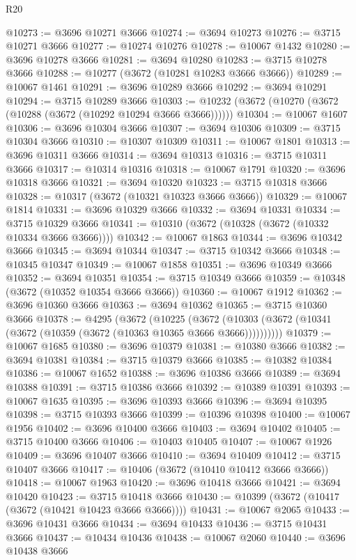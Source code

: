 \begin{lexlean}{R20}
\begin{coremodule}
@10273 := @3696 @10271 @3666
@10274 := @3694 @10273
@10276 := @3715 @10271 @3666
@10277 := @10274 @10276
@10278 := @10067 @1432
@10280 := @3696 @10278 @3666
@10281 := @3694 @10280
@10283 := @3715 @10278 @3666
@10288 := @10277 (@3672 (@10281 @10283 @3666 @3666))
@10289 := @10067 @1461
@10291 := @3696 @10289 @3666
@10292 := @3694 @10291
@10294 := @3715 @10289 @3666
@10303 := @10232 (@3672 (@10270 (@3672 (@10288 (@3672 (@10292 @10294 @3666 @3666))))))
@10304 := @10067 @1607
@10306 := @3696 @10304 @3666
@10307 := @3694 @10306
@10309 := @3715 @10304 @3666
@10310 := @10307 @10309
@10311 := @10067 @1801
@10313 := @3696 @10311 @3666
@10314 := @3694 @10313
@10316 := @3715 @10311 @3666
@10317 := @10314 @10316
@10318 := @10067 @1791
@10320 := @3696 @10318 @3666
@10321 := @3694 @10320
@10323 := @3715 @10318 @3666
@10328 := @10317 (@3672 (@10321 @10323 @3666 @3666))
@10329 := @10067 @1814
@10331 := @3696 @10329 @3666
@10332 := @3694 @10331
@10334 := @3715 @10329 @3666
@10341 := @10310 (@3672 (@10328 (@3672 (@10332 @10334 @3666 @3666))))
@10342 := @10067 @1863
@10344 := @3696 @10342 @3666
@10345 := @3694 @10344
@10347 := @3715 @10342 @3666
@10348 := @10345 @10347
@10349 := @10067 @1858
@10351 := @3696 @10349 @3666
@10352 := @3694 @10351
@10354 := @3715 @10349 @3666
@10359 := @10348 (@3672 (@10352 @10354 @3666 @3666))
@10360 := @10067 @1912
@10362 := @3696 @10360 @3666
@10363 := @3694 @10362
@10365 := @3715 @10360 @3666
@10378 := @4295
    (@3672
      (@10225
        (@3672 (@10303 (@3672 (@10341 (@3672 (@10359 (@3672 (@10363 @10365 @3666 @3666))))))))))
@10379 := @10067 @1685
@10380 := @3696 @10379
@10381 := @10380 @3666
@10382 := @3694 @10381
@10384 := @3715 @10379 @3666
@10385 := @10382 @10384
@10386 := @10067 @1652
@10388 := @3696 @10386 @3666
@10389 := @3694 @10388
@10391 := @3715 @10386 @3666
@10392 := @10389 @10391
@10393 := @10067 @1635
@10395 := @3696 @10393 @3666
@10396 := @3694 @10395
@10398 := @3715 @10393 @3666
@10399 := @10396 @10398
@10400 := @10067 @1956
@10402 := @3696 @10400 @3666
@10403 := @3694 @10402
@10405 := @3715 @10400 @3666
@10406 := @10403 @10405
@10407 := @10067 @1926
@10409 := @3696 @10407 @3666
@10410 := @3694 @10409
@10412 := @3715 @10407 @3666
@10417 := @10406 (@3672 (@10410 @10412 @3666 @3666))
@10418 := @10067 @1963
@10420 := @3696 @10418 @3666
@10421 := @3694 @10420
@10423 := @3715 @10418 @3666
@10430 := @10399 (@3672 (@10417 (@3672 (@10421 @10423 @3666 @3666))))
@10431 := @10067 @2065
@10433 := @3696 @10431 @3666
@10434 := @3694 @10433
@10436 := @3715 @10431 @3666
@10437 := @10434 @10436
@10438 := @10067 @2060
@10440 := @3696 @10438 @3666

\end{coremodule}
\end{lexlean}

